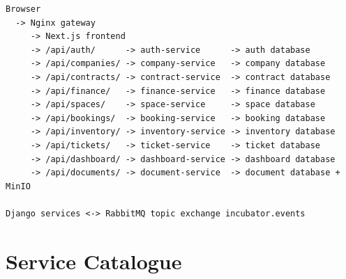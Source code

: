 \documentclass[12pt,a4paper]{report}
\begin{document}
\begin{lstlisting}[caption={Simplified runtime topology}]
Browser
  -> Nginx gateway
     -> Next.js frontend
     -> /api/auth/      -> auth-service      -> auth database
     -> /api/companies/ -> company-service   -> company database
     -> /api/contracts/ -> contract-service  -> contract database
     -> /api/finance/   -> finance-service   -> finance database
     -> /api/spaces/    -> space-service     -> space database
     -> /api/bookings/  -> booking-service   -> booking database
     -> /api/inventory/ -> inventory-service -> inventory database
     -> /api/tickets/   -> ticket-service    -> ticket database
     -> /api/dashboard/ -> dashboard-service -> dashboard database
     -> /api/documents/ -> document-service  -> document database + MinIO

Django services <-> RabbitMQ topic exchange incubator.events
\end{lstlisting}

\section{Service Catalogue}
\label{sec:service-catalogue}
\end{document}
